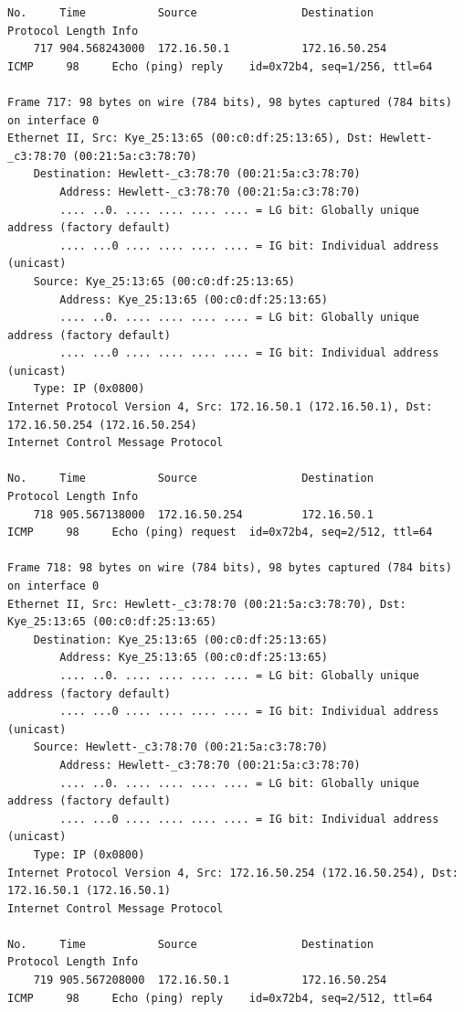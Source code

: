 \documentclass[a4paper,11pt]{article}
\begin{document}
\begin{lstlisting}
No.     Time           Source                Destination           Protocol Length Info
    717 904.568243000  172.16.50.1           172.16.50.254         ICMP     98     Echo (ping) reply    id=0x72b4, seq=1/256, ttl=64

Frame 717: 98 bytes on wire (784 bits), 98 bytes captured (784 bits) on interface 0
Ethernet II, Src: Kye_25:13:65 (00:c0:df:25:13:65), Dst: Hewlett-_c3:78:70 (00:21:5a:c3:78:70)
    Destination: Hewlett-_c3:78:70 (00:21:5a:c3:78:70)
        Address: Hewlett-_c3:78:70 (00:21:5a:c3:78:70)
        .... ..0. .... .... .... .... = LG bit: Globally unique address (factory default)
        .... ...0 .... .... .... .... = IG bit: Individual address (unicast)
    Source: Kye_25:13:65 (00:c0:df:25:13:65)
        Address: Kye_25:13:65 (00:c0:df:25:13:65)
        .... ..0. .... .... .... .... = LG bit: Globally unique address (factory default)
        .... ...0 .... .... .... .... = IG bit: Individual address (unicast)
    Type: IP (0x0800)
Internet Protocol Version 4, Src: 172.16.50.1 (172.16.50.1), Dst: 172.16.50.254 (172.16.50.254)
Internet Control Message Protocol

No.     Time           Source                Destination           Protocol Length Info
    718 905.567138000  172.16.50.254         172.16.50.1           ICMP     98     Echo (ping) request  id=0x72b4, seq=2/512, ttl=64

Frame 718: 98 bytes on wire (784 bits), 98 bytes captured (784 bits) on interface 0
Ethernet II, Src: Hewlett-_c3:78:70 (00:21:5a:c3:78:70), Dst: Kye_25:13:65 (00:c0:df:25:13:65)
    Destination: Kye_25:13:65 (00:c0:df:25:13:65)
        Address: Kye_25:13:65 (00:c0:df:25:13:65)
        .... ..0. .... .... .... .... = LG bit: Globally unique address (factory default)
        .... ...0 .... .... .... .... = IG bit: Individual address (unicast)
    Source: Hewlett-_c3:78:70 (00:21:5a:c3:78:70)
        Address: Hewlett-_c3:78:70 (00:21:5a:c3:78:70)
        .... ..0. .... .... .... .... = LG bit: Globally unique address (factory default)
        .... ...0 .... .... .... .... = IG bit: Individual address (unicast)
    Type: IP (0x0800)
Internet Protocol Version 4, Src: 172.16.50.254 (172.16.50.254), Dst: 172.16.50.1 (172.16.50.1)
Internet Control Message Protocol

No.     Time           Source                Destination           Protocol Length Info
    719 905.567208000  172.16.50.1           172.16.50.254         ICMP     98     Echo (ping) reply    id=0x72b4, seq=2/512, ttl=64


\end{lstlisting}
\end{document}
